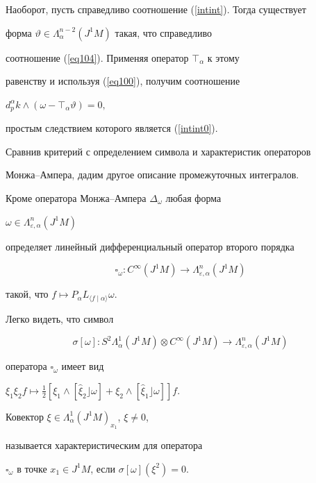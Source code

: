 \begin{pf}
Наоборот, пусть справедливо соотношение (\ref{intint}). Тогда существует


форма $\vartheta \in \Lambda_\alpha^{n-2}(J^1M)$ такая, что справедливо 


соотношение (\ref{eq104}). Применяя оператор $\top_\alpha$ к этому 


равенству и используя (\ref{eq100}), получим соотношение 


$d_p^\alpha k\wedge (\omega -\top_\alpha \vartheta )=0,$ 


простым следствием которого является (\ref{intint0}).


\end{pf}





Сравнив критерий с определением символа и характеристик операторов 


Монжа--Ампера, дадим другое описание промежуточных интегралов.





Кроме оператора Монжа--Ампера $\Delta_\omega$ любая форма


$\omega\in\Lambda_{\varepsilon,\alpha}^n(J^1M)$


определяет линейный дифференциальный оператор второго порядка


$$


\square_\omega:C^\infty(J^1M)\to\Lambda_{\varepsilon,\alpha}^n(J^1M)


$$


такой, что $f\mapsto P_\alpha L_{\langle f\mid \alpha \rangle}\omega$.


Легко видеть, что символ


$$


\sigma [\omega ]:S^2\Lambda_\alpha^1(J^1M)\otimes C^\infty


(J^1M)\to \Lambda_{\varepsilon ,\alpha }^n(J^1M) 


$$


оператора $\square_\omega $ имеет вид


$\xi_1\xi_2 f\mapsto\frac 12[\xi_1\wedge [\widehat{\xi}_2\rfloor\omega]+


\xi_2\wedge [\widehat{\xi }_1\rfloor \omega ]]f$. 





\begin{defn}


Ковектор $\xi \in \Lambda_\alpha^1(J^1M)_{x_1}$, $\xi \neq 0$,


называется характеристическим для оператора


$\square_\omega $ в точке $x_1\in J^1M$, если $\sigma [\omega ](\xi^2)=0$.


\end{defn}





